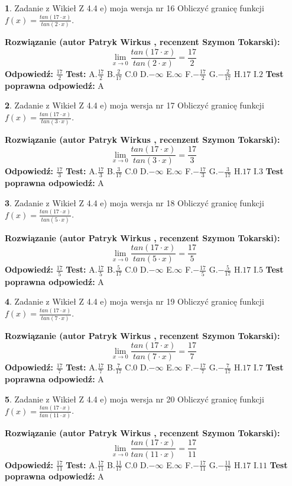 \documentclass[12pt, a4paper]{article}
\theoremstyle{definition} %
\newtheorem{zad}{}
\newcommand{\zadStart}[1]{\begin{zad}#1\newline}
\newcommand{\zadStop}{\end{zad}}
\newcommand{\rozwStart}[2]{\noindent \textbf{Rozwiązanie (autor #1 , recenzent #2): }\newline}
\newcommand{\rozwStop}{\newline}
\newcommand{\odpStart}{\noindent \textbf{Odpowiedź:}\newline}
\newcommand{\odpStop}{\newline}
\newcommand{\testStart}{\noindent \textbf{Test:}\newline}
\newcommand{\testStop}{\newline}
\newcommand{\kluczStart}{\noindent \textbf{Test poprawna odpowiedź:}\newline}
\newcommand{\kluczStop}{\newline}
\begin{document}
\zadStart{Zadanie z Wikieł Z 4.4 e) moja wersja nr 16}
Obliczyć granicę funkcji $f(x)=\frac{tan(17\cdot x)}{tan(2\cdot x)}$.
\zadStop
\rozwStart{Patryk Wirkus}{Szymon Tokarski}
$$\lim\limits_{x\to 0}\frac{tan(17\cdot x)}{tan(2\cdot x)}=
\frac{17}{2}$$
\rozwStop
\odpStart
$\frac{17}{2}$
\odpStop
\testStart
A.$\frac{17}{2}$
B.$\frac{2}{17}$
C.$0$
D.$-\infty$
E.$\infty$
F.$-\frac{17}{2}$
G.$-\frac{2}{17}$
H.$17$
I.$2$
\testStop
\kluczStart
A
\kluczStop



\zadStart{Zadanie z Wikieł Z 4.4 e) moja wersja nr 17}
Obliczyć granicę funkcji $f(x)=\frac{tan(17\cdot x)}{tan(3\cdot x)}$.
\zadStop
\rozwStart{Patryk Wirkus}{Szymon Tokarski}
$$\lim\limits_{x\to 0}\frac{tan(17\cdot x)}{tan(3\cdot x)}=
\frac{17}{3}$$
\rozwStop
\odpStart
$\frac{17}{3}$
\odpStop
\testStart
A.$\frac{17}{3}$
B.$\frac{3}{17}$
C.$0$
D.$-\infty$
E.$\infty$
F.$-\frac{17}{3}$
G.$-\frac{3}{17}$
H.$17$
I.$3$
\testStop
\kluczStart
A
\kluczStop



\zadStart{Zadanie z Wikieł Z 4.4 e) moja wersja nr 18}
Obliczyć granicę funkcji $f(x)=\frac{tan(17\cdot x)}{tan(5\cdot x)}$.
\zadStop
\rozwStart{Patryk Wirkus}{Szymon Tokarski}
$$\lim\limits_{x\to 0}\frac{tan(17\cdot x)}{tan(5\cdot x)}=
\frac{17}{5}$$
\rozwStop
\odpStart
$\frac{17}{5}$
\odpStop
\testStart
A.$\frac{17}{5}$
B.$\frac{5}{17}$
C.$0$
D.$-\infty$
E.$\infty$
F.$-\frac{17}{5}$
G.$-\frac{5}{17}$
H.$17$
I.$5$
\testStop
\kluczStart
A
\kluczStop



\zadStart{Zadanie z Wikieł Z 4.4 e) moja wersja nr 19}
Obliczyć granicę funkcji $f(x)=\frac{tan(17\cdot x)}{tan(7\cdot x)}$.
\zadStop
\rozwStart{Patryk Wirkus}{Szymon Tokarski}
$$\lim\limits_{x\to 0}\frac{tan(17\cdot x)}{tan(7\cdot x)}=
\frac{17}{7}$$
\rozwStop
\odpStart
$\frac{17}{7}$
\odpStop
\testStart
A.$\frac{17}{7}$
B.$\frac{7}{17}$
C.$0$
D.$-\infty$
E.$\infty$
F.$-\frac{17}{7}$
G.$-\frac{7}{17}$
H.$17$
I.$7$
\testStop
\kluczStart
A
\kluczStop



\zadStart{Zadanie z Wikieł Z 4.4 e) moja wersja nr 20}
Obliczyć granicę funkcji $f(x)=\frac{tan(17\cdot x)}{tan(11\cdot x)}$.
\zadStop
\rozwStart{Patryk Wirkus}{Szymon Tokarski}
$$\lim\limits_{x\to 0}\frac{tan(17\cdot x)}{tan(11\cdot x)}=
\frac{17}{11}$$
\rozwStop
\odpStart
$\frac{17}{11}$
\odpStop
\testStart
A.$\frac{17}{11}$
B.$\frac{11}{17}$
C.$0$
D.$-\infty$
E.$\infty$
F.$-\frac{17}{11}$
G.$-\frac{11}{17}$
H.$17$
I.$11$
\testStop
\kluczStart
A
\kluczStop
\end{document}
